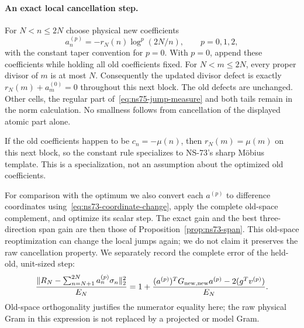 \documentclass[11pt]{article}
\theoremstyle{remark}
\begin{document}
\paragraph{An exact local cancellation step.}
For $N<n\leq2N$ choose physical new coefficients
\[
 a_n^{(p)}=-r_N(n)\log^p(2N/n),\qquad p=0,1,2,
\]
with the constant taper convention for $p=0$.
With $p=0$, append these coefficients while holding all old coefficients
fixed. For $N<m\leq2N$, every proper divisor of $m$ is at most $N$.
Consequently the updated divisor defect is exactly
$r_N(m)+a_m^{(0)}=0$ throughout this next block. The old defects are
unchanged. Other cells, the regular part of~\eqref{eq:ns75-jump-measure}
and both tails remain in the norm calculation. No smallness follows
from cancellation of the displayed atomic part alone.

If the old coefficients happen to be $c_n=-\mu(n)$, then
$r_N(m)=\mu(m)$ on this next block, so the constant rule specializes
to NS-73's sharp M\"obius template. This is a specialization, not an
assumption about the optimized old coefficients.

For comparison with the optimum we also convert each $a^{(p)}$ to
difference coordinates using~\eqref{eq:ns73-coordinate-change}, apply
the complete old-space complement, and optimize its scalar step.
The exact gain and the best three-direction span gain are then those
of Proposition~\ref{prop:ns73-span}. This old-space reoptimization
can change the local jumps again; we do not claim it preserves the
raw cancellation property. We separately record the complete error
of the held-old, unit-sized step:
\[
 \frac{\|R_N-\sum_{n=N+1}^{2N}a_n^{(p)}\sigma_n\|_2^2}{E_N}
 =1+\frac{(a^{(p)})^TG_{\rm new,new}a^{(p)}
                 -2(g^Tv^{(p)})}{E_N}.
\]
Old-space orthogonality justifies the numerator equality here;
the raw physical Gram in this expression is not replaced by a
projected or model Gram.
\end{document}
